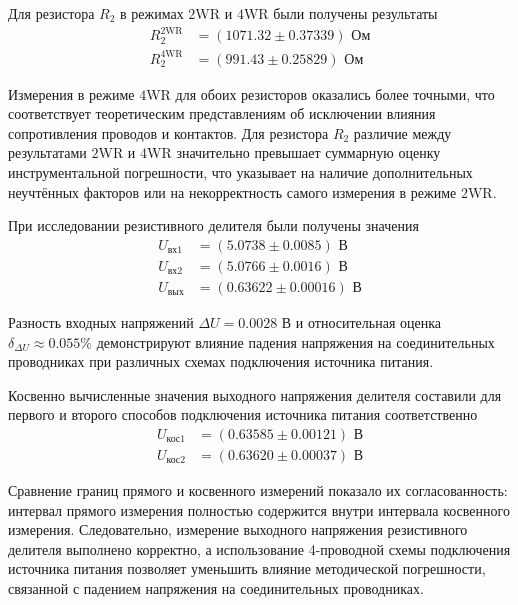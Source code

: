 \documentclass[12pt,a4paper]{article}
\begin{document}
Для резистора $R_2$ в режимах $2$WR и $4$WR были получены результаты
\begin{equation*}
	\begin{aligned}
		R_{2}^{2\text{WR}} &= (1071.32 \pm 0.37339)\text{ Ом}\\
		R_{2}^{4\text{WR}} &= (991.43 \pm 0.25829)\text{ Ом}
	\end{aligned}
\end{equation*}

Измерения в режиме $4$WR для обоих резисторов оказались более точными, что соответствует
теоретическим представлениям об исключении влияния сопротивления проводов и контактов.
Для резистора $R_2$ различие между результатами $2$WR и $4$WR значительно превышает
суммарную оценку инструментальной погрешности, что указывает на наличие дополнительных
неучтённых факторов или на некорректность самого измерения в режиме $2$WR.

При исследовании резистивного делителя были получены значения
\begin{equation*}
	\begin{aligned}
		U_{\text{вх1}} &= (5.0738 \pm 0.0085)\text{ В}\\
		U_{\text{вх2}} &= (5.0766 \pm 0.0016)\text{ В}\\
		U_{\text{вых}} &= (0.63622 \pm 0.00016)\text{ В}
	\end{aligned}
\end{equation*}

Разность входных напряжений
$\Delta U = 0.0028\text{ В}$ и относительная оценка
$\delta_{\Delta U} \approx 0.055\%$
демонстрируют влияние падения напряжения на соединительных проводниках при различных схемах
подключения источника питания.

Косвенно вычисленные значения выходного напряжения делителя составили для первого и 
второго способов подключения источника питания соответственно
\begin{equation*}
	\begin{aligned}
		U_{\text{кос1}} &= (0.63585 \pm 0.00121)\text{ В}\\
		U_{\text{кос2}} &= (0.63620 \pm 0.00037)\text{ В}
	\end{aligned}
\end{equation*}

Сравнение границ прямого и косвенного измерений показало их согласованность:
интервал прямого измерения полностью содержится внутри интервала косвенного измерения.
Следовательно, измерение выходного напряжения резистивного делителя выполнено корректно,
а использование 4-проводной схемы подключения источника питания позволяет уменьшить влияние
методической погрешности, связанной с падением напряжения на соединительных проводниках.
\end{document}

